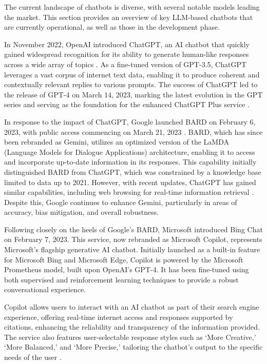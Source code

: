 The current landscape of chatbots is diverse, with several notable models leading the market. This section provides an overview of key LLM-based chatbots that are currently operational, as well as those in the development phase.

In November 2022, OpenAI introduced ChatGPT, an AI chatbot that quickly gained widespread recognition for its ability to generate human-like responses across a wide array of topics \cite{wikipedia2023chatgpt}. As a fine-tuned version of GPT-3.5, ChatGPT leverages a vast corpus of internet text data, enabling it to produce coherent and contextually relevant replies to various prompts. The success of ChatGPT led to the release of GPT-4 on March 14, 2023, marking the latest evolution in the GPT series and serving as the foundation for the enhanced ChatGPT Plus service \cite{ali2022performance}.

In response to the impact of ChatGPT, Google launched BARD on February 6, 2023, with public access commencing on March 21, 2023 \cite{wikipedia2023gemini}. BARD, which has since been rebranded as Gemini, utilizes an optimized version of the LaMDA (Language Models for Dialogue Applications) architecture, enabling it to access and incorporate up-to-date information in its responses. This capability initially distinguished BARD from ChatGPT, which was constrained by a knowledge base limited to data up to 2021. However, with recent updates, ChatGPT has gained similar capabilities, including web browsing for real-time information retrieval \cite{aljazeera2023chatgpt}. Despite this, Google continues to enhance Gemini, particularly in areas of accuracy, bias mitigation, and overall robustness.

Following closely on the heels of Google’s BARD, Microsoft introduced Bing Chat on February 7, 2023. This service, now rebranded as Microsoft Copilot, represents Microsoft’s flagship generative AI chatbot. Initially launched as a built-in feature for Microsoft Bing and Microsoft Edge, Copilot is powered by the Microsoft Prometheus model, built upon OpenAI’s GPT-4. It has been fine-tuned using both supervised and reinforcement learning techniques to provide a robust conversational experience.

Copilot allows users to interact with an AI chatbot as part of their search engine experience, offering real-time internet access and responses supported by citations, enhancing the reliability and transparency of the information provided. The service also features user-selectable response styles such as ‘More Creative,’ ‘More Balanced,’ and ‘More Precise,’ tailoring the chatbot’s output to the specific needs of the user \cite{microsoft2024copilot, wikipedia2023copilot}.

